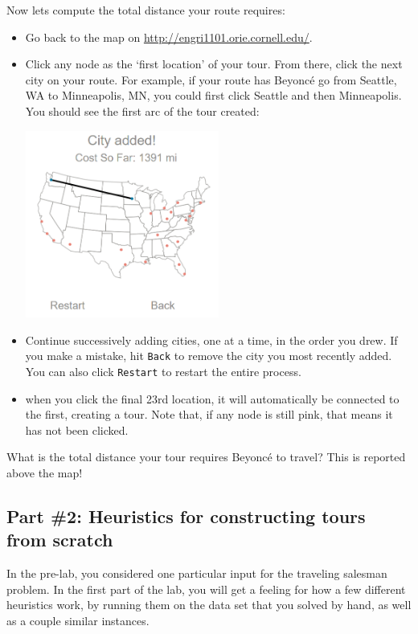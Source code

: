 \documentclass[twoside]{article}%
\begin{document}
\vskip 2in
\noindent
Now lets compute the total distance your route requires:
\begin{itemize}
\item Go back to the map on \url{http://engri1101.orie.cornell.edu/}.
\item Click any node as the `first location' of your tour.  From there, click the next city on your route.  For example, if your route has  Beyonc\'{e} go from Seattle, WA to Minneapolis, MN, you could first click Seattle and then Minneapolis.  You should see the first arc of the tour created:

\begin{center}
\includegraphics[width=0.5\textwidth]{BeyonceGraph2.png}
\end{center}
\item Continue successively adding cities, one at a time, in the order you drew.  If you make a mistake, hit \texttt{Back}  to remove the city you most recently added.  You can also click \texttt{Restart} to restart the entire process.
\item when you click the final 23rd location, it will automatically be connected to the first, creating a tour.  Note that, if any node is still pink, that means it has not been clicked.
\end{itemize}
What is the total distance your tour requires Beyonc\'{e} to travel?  This is reported above the map!

\vskip 2in

\subsection*{Part \#2: Heuristics for constructing tours from scratch}


In the pre-lab, you considered one particular input for the traveling
salesman problem. In the first part of the lab, you will get a feeling
for how a few different heuristics work, by running them on
the data set that you solved by hand, as well as a couple similar
instances.
\end{document}
